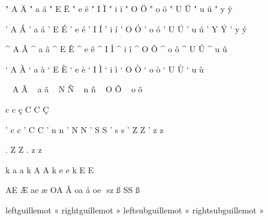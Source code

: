 

\startencoding[pdfdoc]

  " A ^^c4 
  " a ^^e4
  " E ^^cb
  " e ^^eb
  " I ^^cf
  " i ^^ef
  " O ^^d6
  " o ^^f6
  " U ^^dc
  " u ^^fc
  " y ^^ff
             
  ' A ^^c1
  ' a ^^e1
  ' E ^^c9
  ' e ^^e9
  ' I ^^cd
  ' i ^^ed
  ' O ^^d3
  ' o ^^f3
  ' U ^^da
  ' u ^^fa
  ' Y ^^dd
  ' y ^^fd

  ^ A ^^c2
  ^ a ^^e2
  ^ E ^^ca
  ^ e ^^ea
  ^ I ^^ce
  ^ i ^^ee
  ^ O ^^d4
  ^ o ^^f4
  ^ U ^^db
  ^ u ^^fb
             
  ` A ^^c0
  ` a ^^e0
  ` E ^^c8
  ` e ^^e8
  ` I ^^cc
  ` i ^^ec
  ` O ^^d2
  ` o ^^f2
  ` U ^^d9
  ` u ^^f9
             
  ~ A ^^c3
  ~ a ^^e3
  ~ N ^^d1
  ~ n ^^f1
  ~ O ^^d5
  ~ o ^^f5

  c c ^^e7 
  C C ^^c7

  ' c  c %
  ' C  C %
  ' n  n %
  ' N  N %
  ' S  S %
  ' s  s %
  ' Z  Z %
  ' z  z %

  . Z  Z %
  . z  z %

  k a  a %
  k A  A %
  k e  e %
  k E  E %

 AE ^^c6
 ae ^^e6
 OA ^^c5
 oa ^^e5
 oe ^^9c
 sz ^^df
 SS ^^df

 leftguillemot     ^^ab
 rightguillemot    ^^bb
 leftsubguillemot  ^^ab
 rightsubguillemot ^^bb

\stopencoding

\endinput
